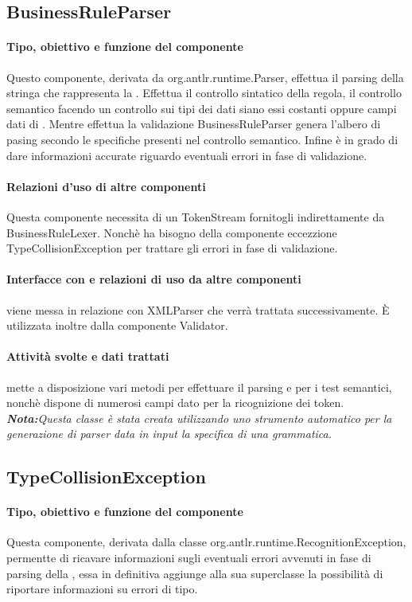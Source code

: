 \documentclass[11pt,titlepage,a4paper]{report}
\begin{document}
\subsection{BusinessRuleParser}
\paragraph{Tipo, obiettivo e funzione del componente}
Questo componente, derivata da org.antlr.runtime.Parser, effettua il parsing della stringa che rappresenta la \br. Effettua il controllo sintatico della regola, il controllo semantico facendo un controllo sui tipi dei dati siano essi costanti oppure campi dati di \bos. Mentre effettua la validazione BusinessRuleParser genera l'albero di pasing secondo le specifiche presenti nel controllo semantico. Infine \`e in grado di dare informazioni accurate 
riguardo eventuali errori in fase di validazione.
\paragraph{Relazioni d'uso di altre componenti}
Questa componente necessita di un TokenStream fornitogli indirettamente da BusinessRuleLexer. Nonchè ha bisogno della componente eccezzione TypeCollisionException per trattare gli errori in fase di validazione.
\paragraph{Interfacce con e relazioni di uso da altre componenti}
\brp viene messa in relazione con XMLParser che verr\`a trattata successivamente.
\`E utilizzata inoltre dalla componente Validator.
\paragraph{Attivit\`a svolte e dati trattati}
\brp mette a disposizione vari metodi per effettuare il parsing e per i test semantici, nonch\`e dispone di numerosi campi dato per la ricognizione dei token.
\textit{\textbf{Nota:}Questa classe \`e stata creata utilizzando uno strumento automatico per la generazione di parser data in input la specifica di una grammatica.}

\subsection{TypeCollisionException}
\paragraph{Tipo, obiettivo e funzione del componente}
Questa componente, derivata dalla classe org.antlr.runtime.RecognitionException, permentte di ricavare informazioni sugli eventuali errori avvenuti in fase di parsing della \br, essa in definitiva aggiunge alla sua superclasse la possibilit\`a di riportare informazioni su errori di tipo.
\end{document}
